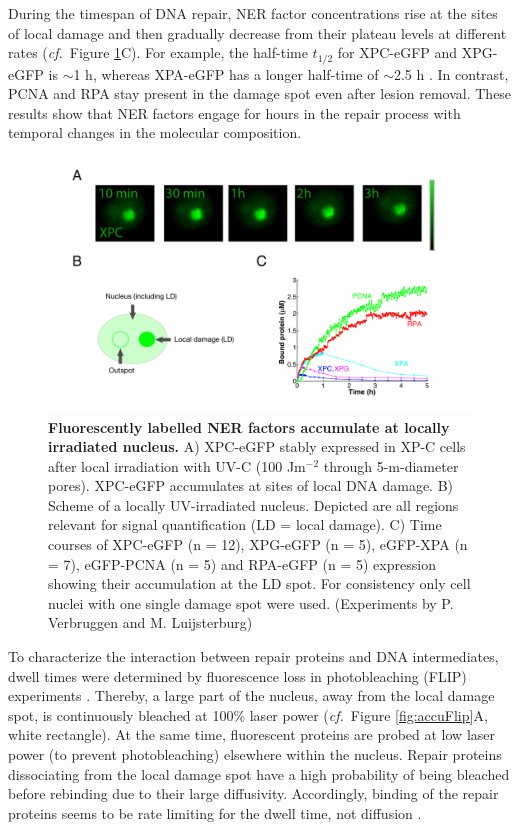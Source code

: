 During the timespan of DNA repair, NER factor concentrations rise at the sites of local damage and then gradually decrease from their plateau levels at different rates (\textit{cf.}\ Figure \ref{fig:accuImage}C). For example, the half-time $t_\text{1/2}$ for XPC-eGFP and XPG-eGFP is $\sim$1 h, whereas XPA-eGFP has a longer half-time of $\sim$2.5 h \cite{Luijsterburg2010}. In contrast, PCNA and RPA stay present in the damage spot even after lesion removal. These results show that NER factors engage for hours in the repair process with temporal changes in the molecular composition.\\
\begin{figure}[t!]
	\begin{center}
		\includegraphics[width=1\textwidth]{Abbildungen/figure2_2.pdf}
		\caption{\textbf{Fluorescently labelled NER factors accumulate at locally irradiated nucleus.} A) XPC-eGFP  stably expressed in XP-C cells  after local irradiation with UV-C (100 J$\text{m}^{-\text{2}}$ through 5-\textmu m-diameter pores). XPC-eGFP accumulates at sites of local DNA damage.  B) Scheme of a locally UV-irradiated nucleus. Depicted are all regions relevant for signal quantification (LD = local damage). C) Time courses of XPC-eGFP (n = 12), XPG-eGFP (n = 5), eGFP-XPA (n = 7), eGFP-PCNA (n = 5) and RPA-eGFP (n = 5) expression showing their accumulation at the LD spot. For consistency only cell nuclei with one single damage spot were used. (Experiments by P. Verbruggen and M. Luijsterburg)}
		\label{fig:accuImage}
	\end{center}
\end{figure}
To characterize the interaction between repair proteins and DNA intermediates, dwell times were determined by fluorescence loss in photobleaching (FLIP) experiments \cite{Luijsterburg2010}. Thereby, a large part of the nucleus, away from the local damage spot, is continuously bleached at 100\% laser power (\textit{cf.}\ Figure \ref{fig:accuFlip}A, white rectangle). At the same time, fluorescent proteins are probed at low laser power (to prevent photobleaching) elsewhere within the nucleus. Repair proteins dissociating from the local damage spot have a high probability of being bleached before rebinding due to their large diffusivity. Accordingly, binding of the repair proteins seems to be rate limiting for the dwell time, not diffusion \cite{Luijsterburg2010}.\\
